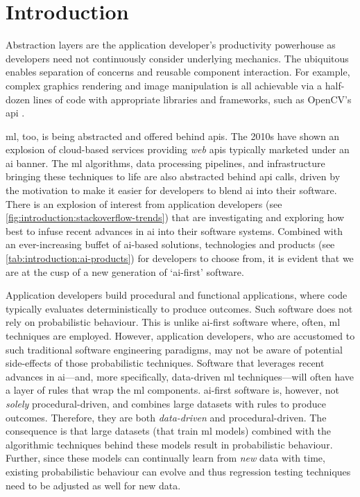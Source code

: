 \chapter{Introduction}
\label{ch:introduction}
\graphicspath{{mainmatter/introduction/figures/}}

\glsresetall

Abstraction layers are the application developer's productivity powerhouse as developers need not continuously consider underlying mechanics. The ubiquitous  enables separation of concerns and reusable component interaction. For example, complex graphics rendering and image manipulation is all achievable via a half-dozen lines of code with appropriate libraries and frameworks, such as OpenCV's \gls{api} \citep{opencv_library}.

\Gls{ml}, too, is being abstracted and offered behind \glspl{api}. The 2010s have shown an explosion of cloud-based services providing \textit{web} \glspl{api} typically marketed under an \gls{ai} banner. The \gls{ml} algorithms, data processing pipelines, and infrastructure bringing these techniques to life are also abstracted behind \gls{api} calls, driven by the motivation to make it easier for developers to blend \gls{ai} into their software.
There is an explosion of interest from application developers (see \cref{fig:introduction:stackoverflow-trends}) that are investigating and exploring how best to infuse recent advances in \gls{ai} into their software systems. Combined with an ever-increasing buffet of \gls{ai}-based solutions, technologies and products (see \cref{tab:introduction:ai-products}) for developers to choose from, it is evident that we are at the cusp of a new generation of `\gls{ai}-first' software.

Application developers build procedural and functional applications, where code typically evaluates deterministically to produce outcomes. Such software does not rely on probabilistic behaviour. This is unlike \gls{ai}-first software where, often, \gls{ml} techniques are employed. However, application developers, who are accustomed to such traditional software engineering paradigms, may not be aware of potential side-effects of those probabilistic techniques. Software that leverages recent advances in \gls{ai}---and, more specifically, data-driven \gls{ml} techniques---will often have a layer of rules that wrap the \gls{ml} components.
\Gls{ai}-first software is, however, not \textit{solely} procedural-driven, and combines large datasets with rules to produce outcomes. Therefore, they are both \textit{data-driven} and procedural-driven. The consequence is that large datasets (that train \gls{ml} models) combined with the algorithmic techniques behind these models result in probabilistic behaviour. Further, since these models can continually learn from \textit{new} data with time, existing probabilistic behaviour can evolve and thus regression testing techniques need to be adjusted as well for new data. 

